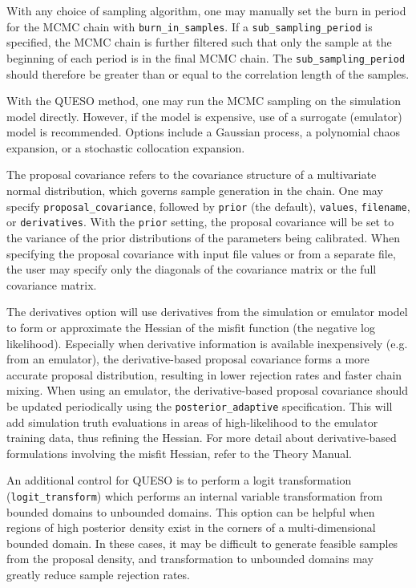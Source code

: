 With any choice of sampling algorithm, one may manually set the burn in 
period for the MCMC chain with \texttt{burn\_in\_samples}. If a 
\texttt{sub\_sampling\_period} is specified, the MCMC chain is further 
filtered such that only the sample at the beginning of each period is in 
the final MCMC chain. The \texttt{sub\_sampling\_period} should therefore 
be greater than or equal to the correlation length of the samples.

With the QUESO method, one may run the MCMC sampling on the simulation
model directly.  However, if the model is expensive, use of a
surrogate (emulator) model is recommended.  Options include a Gaussian
process, a polynomial chaos expansion, or a stochastic collocation
expansion.

The proposal covariance refers to the covariance structure of a
multivariate normal distribution, which governs sample generation in
the chain.  One may specify \texttt{proposal\_covariance}, followed by
\texttt{prior} (the default), \texttt{values}, \texttt{filename}, or
\texttt{derivatives}.  With the \texttt{prior} setting, the proposal
covariance will be set to the variance of the prior distributions of
the parameters being calibrated.  When specifying the proposal
covariance with input file values or from a separate file, the user
may specify only the diagonals of the covariance matrix or the full
covariance matrix.

The derivatives option will use derivatives from the simulation or
emulator model to form or approximate the Hessian of the misfit
function (the negative log likelihood).  Especially when derivative
information is available inexpensively (e.g. from an emulator), the
derivative-based proposal covariance forms a more accurate proposal
distribution, resulting in lower rejection rates and faster chain
mixing.  When using an emulator, the derivative-based proposal
covariance should be updated periodically using the
\texttt{posterior\_adaptive} specification.  This will add simulation
truth evaluations in areas of high-likelihood to the emulator training
data, thus refining the Hessian.  For more detail about
derivative-based formulations involving the misfit Hessian, refer to
the Theory Manual.

An additional control for QUESO is to perform a logit transformation
(\texttt{logit\_transform}) which performs an internal variable
transformation from bounded domains to unbounded
domains. %
This option can be helpful when regions of high posterior density
exist in the corners of a multi-dimensional bounded domain.  In these
cases, it may be difficult to generate feasible samples from the
proposal density, and transformation to unbounded domains may
greatly reduce sample rejection rates.

